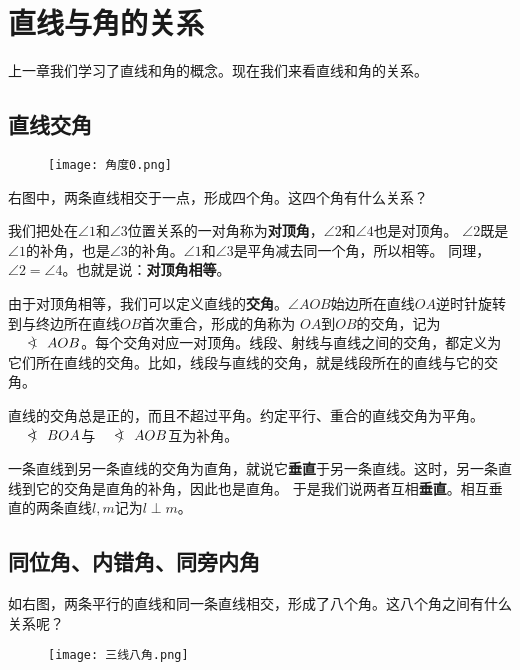 \documentclass[12pt,UTF8]{ctexbook}
\newcommand{\arcangle}{\mathord{\mathpalette\doarcangle\relax}}
\newcommand{\doarcangle}[2]{%
  \hbox{%
    \sbox0{$#1B$}%
    \sbox2{$#1<$}%
    \raisebox{\dimexpr\dp0+(\ht0-\ht2)/2}{%
      $#1<\mspace{-9mu}\mathrel{)}\mspace{2mu}$%
    }%
  }%
}
\begin{document}
\chapter{直线与角的关系}
上一章我们学习了直线和角的概念。现在我们来看直线和角的关系。

\section{直线交角}
\begin{wrapfigure}[5]{r}{0.24\textwidth} %
    \vspace{-20pt}
    \flushright
    \texttt{[image: 角度0.png]}
\end{wrapfigure}

右图中，两条直线相交于一点，形成四个角。这四个角有什么关系？

我们把处在$\angle 1$和$\angle 3$位置关系的一对角称为\textbf{对顶角}，$\angle 2$和$\angle 4$也是对顶角。
$\angle 2$既是$\angle 1$的补角，也是$\angle 3$的补角。$\angle 1$和$\angle 3$是平角减去同一个角，所以相等。
同理，$\angle 2 = \angle 4$。也就是说：\textbf{对顶角相等}。

由于对顶角相等，我们可以定义直线的\textbf{交角}。$\angle AOB$始边所在直线$OA$逆时针旋转到与终边所在直线$OB$首次重合，形成的角称为
$OA$到$OB$的交角，记为$\arcangle AOB$。每个交角对应一对顶角。线段、射线与直线之间的交角，都定义为它们所在直线的交角。比如，线段与直线的交角，就是线段所在的直线与它的交角。

直线的交角总是正的，而且不超过平角。约定平行、重合的直线交角为平角。$\arcangle BOA$与$\arcangle AOB$互为补角。

一条直线到另一条直线的交角为直角，就说它\textbf{垂直}于另一条直线。这时，另一条直线到它的交角是直角的补角，因此也是直角。
于是我们说两者互相\textbf{垂直}。相互垂直的两条直线$l,m$记为$l\perp m$。


\section{同位角、内错角、同旁内角}
如右图，两条平行的直线和同一条直线相交，形成了八个角。这八个角之间有什么关系呢？

\begin{wrapfigure}{r}{0.4\textwidth} %
    \flushright
    \texttt{[image: 三线八角.png]}
\end{wrapfigure}
\end{document}
